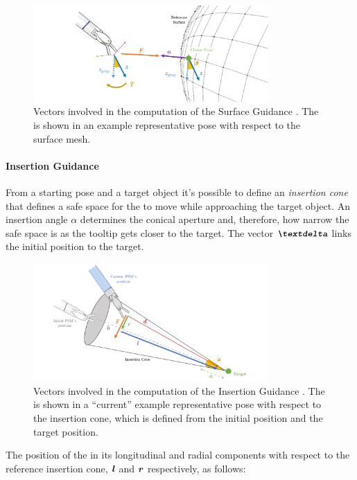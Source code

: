 \documentclass[../main.tex]{subfiles}
\begin{document}
\begin{figure}
    \centering
    \includegraphics[width=0.8\textwidth]{images/surface_guidance.png}
    \caption{Vectors involved in the computation of the Surface Guidance \vf. The \psm is shown in an example representative pose with respect to the surface mesh.}
    \label{fig:surfaceguidance}
\end{figure}


\paragraph{Insertion Guidance} From a starting pose and a target object it's possible to define an \textit{insertion cone} that defines a safe space for the \ee to move while approaching the target object. An insertion angle $\alpha$ determines the conical aperture and, therefore, how narrow the safe space is as the tooltip gets closer to the target. The vector $\vect{\textdelta}$ links the initial \psm position to the target. 

\begin{figure}
    \centering
    \includegraphics[width=0.8\textwidth]{images/insertion_guidance.png}
    \caption{Vectors involved in the computation of the Insertion Guidance \vf. The \psm is shown in a ``current'' example representative pose with respect to the insertion cone, which is defined from the initial \psm position and the target position.}
    \label{fig:insertionguidance}
\end{figure}

The position of the \ee in its longitudinal and radial components with respect to the reference insertion cone, $\textbf{\textit{l}}$ and $\textbf{\textit{r}}$ respectively, as follows:
\end{document}
